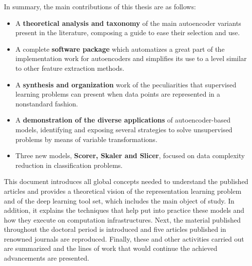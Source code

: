 In summary, the main contributions of this thesis are as follows:

\begin{itemize}
    \item A \textbf{theoretical analysis and taxonomy} of the main autoencoder variants present in the literature, composing a guide to ease their selection and use.
    \item A complete \textbf{software package} which automatizes a great part of the implementation work for autoencoders and simplifies its use to a level similar to other feature extraction methods.
    \item A \textbf{synthesis and organization} work of the peculiarities that supervised learning problems can present when data points are represented in a nonstandard fashion.
    \item A \textbf{demonstration of the diverse applications} of autoencoder-based models, identifying and exposing several strategies to solve unsupervised problems by means of variable transformations.
    \item Three new models, \textbf{Scorer, Skaler and Slicer}, focused on data complexity reduction in classification problems.
\end{itemize}

This document introduces all global concepts needed to understand the published articles and provides a theoretical vision of the representation learning problem and of the deep learning tool set, which includes the main object of study. In addition, it explains the techniques that help put into practice these models and how they execute on computation infrastructures. Next, the material published throughout the doctoral period is introduced and five articles published in renowned journals are reproduced. Finally, these and other activities carried out are summarized and the lines of work that would continue the achieved advancements are presented.

%